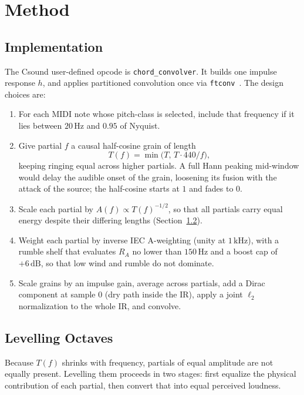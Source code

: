 \documentclass[runningheads,a4paper]{llncs}
\begin{document}
\section{Method}

\subsection{Implementation}

The Csound user-defined opcode is
\texttt{chord\_convolver}. It builds one impulse response $h$, and
applies partitioned convolution once via \texttt{ftconv}~\cite{csoundmanualftconv}.
The design choices are:

\begin{enumerate}
\item
  For each MIDI note whose pitch-class is selected, include that frequency if
  it lies between $20\,\mathrm{Hz}$ and $0.95$ of Nyquist.
\item
  Give partial $f$ a causal half-cosine grain of length
  \[
  T(f)=\min\bigl(T,\,T\cdot 440/f\bigr),
  \]
  keeping ringing equal across higher partials. A full Hann peaking mid-window would delay the
  audible onset of the grain, loosening its fusion with the attack of the
  source; the half-cosine starts at $1$ and fades to $0$.
\item
  Scale each partial by $A(f)\propto T(f)^{-1/2}$, so that all partials carry
  equal energy despite their differing lengths (Section~\ref{sec:levelling}).
\item
  Weight each partial by inverse IEC A-weighting (unity at $1\,\mathrm{kHz}$),
  with a rumble shelf that evaluates $R_A$ no lower than $150\,\mathrm{Hz}$ and
  a boost cap of $+6\,\mathrm{dB}$, so that low wind and rumble do not dominate.
\item
  Scale grains by an impulse gain, average across partials, add a Dirac
  component at sample $0$ (dry path inside the IR), apply a joint $\ell_2$
  normalization to the whole IR, and convolve.
\end{enumerate}

\subsection{Levelling Octaves}
\label{sec:levelling}

Because $T(f)$ shrinks with frequency, partials of equal amplitude are not
equally present. Levelling them proceeds in two stages: first equalize the
physical contribution of each partial, then convert that into equal perceived
loudness.
\end{document}
